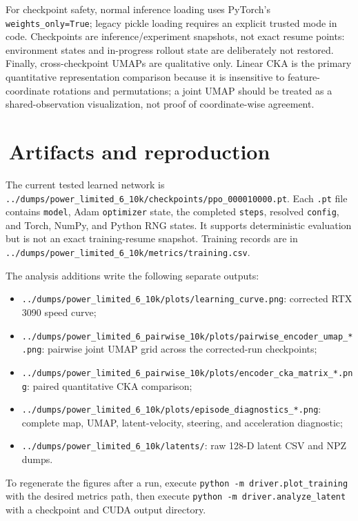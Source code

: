 \documentclass[10pt]{article}
\newcommand{\code}[1]{\texttt{#1}}
\begin{document}
For checkpoint safety, normal inference loading uses PyTorch's
\code{weights\_only=True}; legacy pickle loading requires an explicit trusted
mode in code. Checkpoints are inference/experiment snapshots, not exact resume
points: environment states and in-progress rollout state are deliberately not
restored. Finally, cross-checkpoint UMAPs are qualitative only. Linear CKA is
the primary quantitative representation comparison because it is insensitive to
feature-coordinate rotations and permutations; a joint UMAP should be treated
as a shared-observation visualization, not proof of coordinate-wise agreement.

\section{\,Artifacts and reproduction}
The current tested learned network is
\code{../dumps/power\_limited\_6\_10k/checkpoints/ppo\_000010000.pt}. Each \code{.pt} file contains
\code{model}, Adam \code{optimizer} state, the completed \code{steps}, resolved
\code{config}, and Torch, NumPy, and Python RNG states. It supports deterministic
evaluation but is not an exact training-resume snapshot.
Training records are in \code{../dumps/power\_limited\_6\_10k/metrics/training.csv}.

The analysis additions write the following separate outputs:
\begin{itemize}[leftmargin=1.4em,itemsep=2pt]
 \item \code{../dumps/power\_limited\_6\_10k/plots/learning\_curve.png}: corrected RTX 3090 speed curve;
 \item \code{../dumps/power\_limited\_6\_pairwise\_10k/plots/pairwise\_encoder\_umap\_*.png}: pairwise
       joint UMAP grid across the corrected-run checkpoints;
 \item \code{../dumps/power\_limited\_6\_pairwise\_10k/plots/encoder\_cka\_matrix\_*.png}: paired
       quantitative CKA comparison;
 \item \code{../dumps/power\_limited\_6\_10k/plots/episode\_diagnostics\_*.png}: complete map, UMAP,
       latent-velocity, steering, and acceleration diagnostic;
 \item \code{../dumps/power\_limited\_6\_10k/latents/}: raw 128-D latent CSV and NPZ dumps.
\end{itemize}
To regenerate the figures after a run, execute \code{python -m driver.plot\_training}
with the desired metrics path, then execute \code{python -m driver.analyze\_latent}
with a checkpoint and CUDA output directory.
\end{document}
